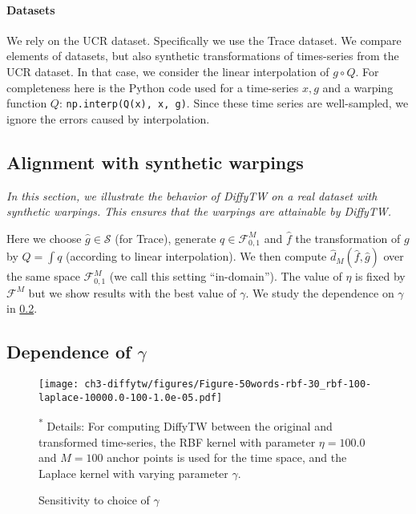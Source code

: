 \paragraph{Datasets} We rely on the UCR dataset\cite{ucr}. Specifically we use the Trace dataset. We compare elements of datasets, but also synthetic transformations of times-series from the UCR dataset. In that case, we consider the linear interpolation of $g \circ Q$. For completeness here is the Python code used for a time-series $x, g$ and a warping function $Q$: \texttt{np.interp(Q(x), x, g)}. Since these time series are well-sampled, we ignore the errors caused by interpolation.



\subsection{Alignment with synthetic warpings} \emph{In this section, we illustrate the behavior of DiffyTW on a real dataset with synthetic warpings. This ensures that the warpings are attainable by DiffyTW.}

Here we choose $\hat g\in\mathcal S$ (for Trace), generate $q \in \mathcal F_{0, 1}^M$ and $\hat f$ the transformation of $g$ by $Q = \int q$ (according to linear interpolation). We then compute $\hat d_M(\hat f, \hat g)$ over the same space $\mathcal F_{0,1}^M$ (we call this setting ``in-domain''). The value of $\eta$ is fixed by $\mathcal F^M$ but we show results with the best value of $\gamma$. We study the dependence on $\gamma$ in \cref{sec:XP-gamma}.










\subsection{Dependence of $\gamma$}\label{sec:XP-gamma}

\begin{figure}[ht!]
\begin{center}
\texttt{[image: ch3-diffytw/figures/Figure-50words-rbf-30\_rbf-100-laplace-10000.0-100-1.0e-05.pdf]}
\end{center}
\caption[itopto]{Sensitivity to choice of $\gamma$}
\small\textsuperscript{*} Details: For computing DiffyTW between the original and transformed time-series, the RBF kernel with parameter $\eta=100.0$ and $M=100$ anchor points is used for the time space, and the Laplace kernel with varying parameter $\gamma$.
\end{figure}

